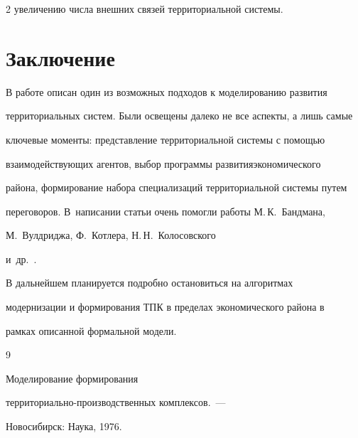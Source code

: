 \begin{multicols}{2}
увеличению числа внешних связей территориальной системы.





\section{Заключение}





  В работе описан один из возможных подходов к моделированию развития 


территориальных систем. Были освещены далеко не все аспекты, а лишь самые 


ключевые моменты: представление территориальной системы с помощью 


взаимодействующих агентов, выбор программы развития\linebreak экономического 


района, формирование набора специализаций территориальной системы путем 


переговоров. В~написании статьи очень помогли работы М.\,К.~Бандмана, 


М.~Вулдриджа, Ф.~Котлера, Н.\,Н.~Колосовского 


и~др.~\cite{1-chu, 2-chu, 6-chu, 7-chu}. 


  


  В дальнейшем планируется подробно остановиться на алгоритмах 


модернизации и формирования ТПК в пределах экономического района в 


рамках описанной формальной модели.





{\small\frenchspacing


{%




\begin{thebibliography}{9}









Моделирование формирования 


тер\-ри\-то\-ри\-аль\-но-про\-из\-вод\-ст\-вен\-ных комплексов.~--- 


Новосибирск: Наука, 1976.






\end{thebibliography}}}
\end{multicols}
